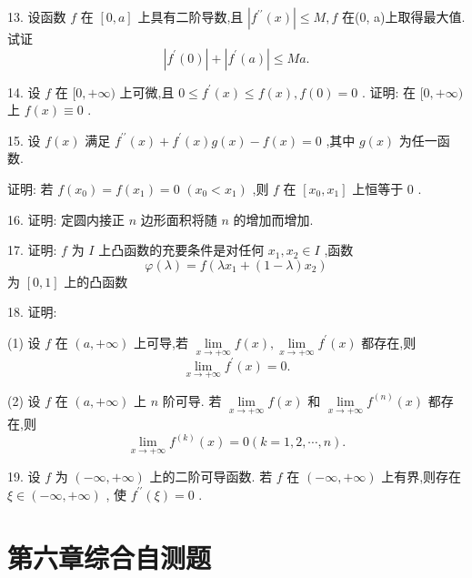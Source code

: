 13. 设函数 \(f\) 在 \(\left\lbrack  {0,a}\right\rbrack\) 上具有二阶导数,且 \(\left| {{f}^{\prime \prime }\left( x\right) }\right|  \leq  M,f\) 在(0, a)上取得最大值. 试证
\[
\left| {{f}^{\prime }\left( 0\right) }\right|  + \left| {{f}^{\prime }\left( a\right) }\right|  \leq  {Ma}.
\]

14. 设 \(f\) 在 \(\lbrack 0, + \infty )\) 上可微,且 \(0 \leq  {f}^{\prime }\left( x\right)  \leq  f\left( x\right) ,f\left( 0\right)  = 0\) . 证明: 在 \(\lbrack 0, + \infty )\) 上 \(f\left( x\right)  \equiv  0\) .

15. 设 \(f\left( x\right)\) 满足 \({f}^{\prime \prime }\left( x\right)  + {f}^{\prime }\left( x\right) g\left( x\right)  - f\left( x\right)  = 0\) ,其中 \(g\left( x\right)\) 为任一函数.

证明: 若 \(f\left( {x}_{0}\right)  = f\left( {x}_{1}\right)  = 0\)  \(\left( {{x}_{0} < {x}_{1}}\right)\) ,则 \(f\) 在 \(\left\lbrack  {{x}_{0},{x}_{1}}\right\rbrack\) 上恒等于 0 .

16. 证明: 定圆内接正 \(n\) 边形面积将随 \(n\) 的增加而增加.

17. 证明: \(f\) 为 \(I\) 上凸函数的充要条件是对任何 \({x}_{1},{x}_{2} \in  I\) ,函数
\[
\varphi \left( \lambda \right)  = f\left( {\lambda {x}_{1} + \left( {1 - \lambda }\right) {x}_{2}}\right)
\]
为 \(\left\lbrack  {0,1}\right\rbrack\) 上的凸函数

18. 证明:

(1) 设 \(f\) 在 \(\left( {a, + \infty }\right)\) 上可导,若 \(\mathop{\lim }\limits_{{x \rightarrow   + \infty }}f\left( x\right) ,\mathop{\lim }\limits_{{x \rightarrow   + \infty }}{f}^{\prime }\left( x\right)\) 都存在,则
\[
\mathop{\lim }\limits_{{x \rightarrow   + \infty }}{f}^{\prime }\left( x\right)  = 0.
\]

(2) 设 \(f\) 在 \(\left( {a, + \infty }\right)\) 上 \(n\) 阶可导. 若 \(\mathop{\lim }\limits_{{x \rightarrow   + \infty }}f\left( x\right)\) 和 \(\mathop{\lim }\limits_{{x \rightarrow   + \infty }}{f}^{\left( n\right) }\left( x\right)\) 都存在,则
\[
\mathop{\lim }\limits_{{x \rightarrow   + \infty }}{f}^{\left( k\right) }\left( x\right)  = 0\left( {k = 1,2,\cdots ,n}\right) .
\]

19. 设 \(f\) 为 \(\left( {-\infty , + \infty }\right)\) 上的二阶可导函数. 若 \(f\) 在 \(\left( {-\infty , + \infty }\right)\) 上有界,则存在 \(\xi  \in  \left( {-\infty , + \infty }\right)\) , 使 \({f}^{\prime \prime }\left( \xi \right)  = 0\) .

\section{第六章综合自测题}

